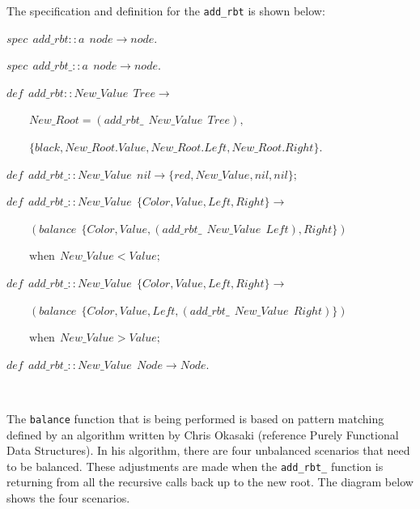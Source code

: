 \documentclass[
]{book}
\begin{document}
The specification and definition for the \texttt{add\_rbt} is shown below:

\begin{formulabox}
\(spec ~ ~ add\_rbt :: a ~ ~ node \rightarrow node.\)

\(spec ~ ~ add\_rbt\_ :: a ~ ~ node \rightarrow node.\)

\(\mathit{def} ~ ~ add\_rbt :: New\_Value ~ ~ Tree \rightarrow\)

\(\quad \quad New\_Root = (add\_rbt\_ ~ ~ New\_Value ~ ~ Tree),\)

\(\quad \quad \lbrace black, New\_Root.Value, New\_Root.\mathit{Left}, New\_Root.Right \rbrace.\)

\(\mathit{def} ~ ~ add\_rbt\_ :: New\_Value ~ ~ nil \rightarrow \lbrace red, New\_Value, nil, nil \rbrace;\)

\(\mathit{def} ~ ~ add\_rbt\_ :: New\_Value ~ ~ \lbrace Color, Value, \mathit{Left}, Right \rbrace \rightarrow\)

\(\quad \quad (balance ~ ~ \lbrace Color, Value, (add\_rbt\_ ~ ~ New\_Value ~ ~ \mathit{Left}), Right \rbrace) ~ ~\)

\(\quad \quad \text{when} ~ ~ New\_Value < Value;\)

\(\mathit{def} ~ ~ add\_rbt\_ :: New\_Value ~ ~ \lbrace Color, Value, \mathit{Left}, Right \rbrace \rightarrow\)

\(\quad \quad (balance ~ ~ \lbrace Color, Value, Left, (add\_rbt\_ ~ ~ New\_Value ~ ~ \mathit{Right}) \rbrace) ~ ~\)

\(\quad \quad \text{when} ~ ~ New\_Value > Value;\)

\(\mathit{def} ~ ~ add\_rbt\_ :: New\_Value ~ ~ Node \rightarrow Node.\)

\end{formulabox}

\(\nonumber\)

The \texttt{balance} function that is being performed is based on pattern matching defined by an algorithm written by Chris Okasaki (reference Purely Functional Data Structures). In his algorithm, there are four unbalanced scenarios that need to be balanced. These adjustments are made when the \texttt{add\_rbt\_} function is returning from all the recursive calls back up to the new root. The diagram below shows the four scenarios.
\end{document}
